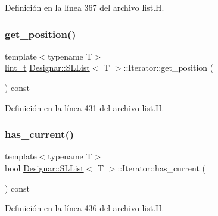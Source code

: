 Definición en la línea 367 del archivo list.\+H.

\mbox{\label{class_designar_1_1_s_l_list_1_1_iterator_a2105a92f98b381c1dc9cdc138e96a22a}} 
\subsubsection{\texorpdfstring{get\+\_\+position()}{get\_position()}}
{\footnotesize\ttfamily template$<$typename T$>$ \\
\hyperlink{namespace_designar_a9d113d66a39e82b73727c72cd3a52f73}{lint\+\_\+t} \hyperlink{class_designar_1_1_s_l_list}{Designar\+::\+S\+L\+List}$<$ T $>$\+::Iterator\+::get\+\_\+position (\begin{DoxyParamCaption}{ }\end{DoxyParamCaption}) const\hspace{0.3cm}{\ttfamily [inline]}}



Definición en la línea 431 del archivo list.\+H.

\mbox{\label{class_designar_1_1_s_l_list_1_1_iterator_ab245268535b61d073d615dc969bcaf5a}} 
\subsubsection{\texorpdfstring{has\+\_\+current()}{has\_current()}}
{\footnotesize\ttfamily template$<$typename T$>$ \\
bool \hyperlink{class_designar_1_1_s_l_list}{Designar\+::\+S\+L\+List}$<$ T $>$\+::Iterator\+::has\+\_\+current (\begin{DoxyParamCaption}{ }\end{DoxyParamCaption}) const\hspace{0.3cm}{\ttfamily [inline]}}



Definición en la línea 436 del archivo list.\+H.

